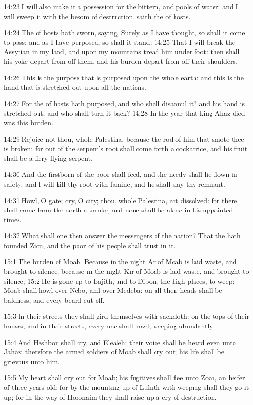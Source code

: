 14:23 I will also make it a possession for the bittern, and pools of water: and I will sweep it with the besom of destruction, saith the \LORD of hosts.

14:24 The \LORD of hosts hath sworn, saying, Surely as I have thought, so shall it come to pass; and as I have purposed, so shall it stand: 14:25 That I will break the Assyrian in my land, and upon my mountains tread him under foot: then shall his yoke depart from off them, and his burden depart from off their shoulders.

14:26 This is the purpose that is purposed upon the whole earth: and this is the hand that is stretched out upon all the nations.

14:27 For the \LORD of hosts hath purposed, and who shall disannul it?  and his hand is stretched out, and who shall turn it back?  14:28 In the year that king Ahaz died was this burden.

14:29 Rejoice not thou, whole Palestina, because the rod of him that smote thee is broken: for out of the serpent's root shall come forth a cockatrice, and his fruit shall be a fiery flying serpent.

14:30 And the firstborn of the poor shall feed, and the needy shall lie down in safety: and I will kill thy root with famine, and he shall slay thy remnant.

14:31 Howl, O gate; cry, O city; thou, whole Palestina, art dissolved: for there shall come from the north a smoke, and none shall be alone in his appointed times.

14:32 What shall one then answer the messengers of the nation? That the \LORD hath founded Zion, and the poor of his people shall trust in it.

15:1 The burden of Moab. Because in the night Ar of Moab is laid waste, and brought to silence; because in the night Kir of Moab is laid waste, and brought to silence; 15:2 He is gone up to Bajith, and to Dibon, the high places, to weep: Moab shall howl over Nebo, and over Medeba: on all their heads shall be baldness, and every beard cut off.

15:3 In their streets they shall gird themselves with sackcloth: on the tops of their houses, and in their streets, every one shall howl, weeping abundantly.

15:4 And Heshbon shall cry, and Elealeh: their voice shall be heard even unto Jahaz: therefore the armed soldiers of Moab shall cry out; his life shall be grievous unto him.

15:5 My heart shall cry out for Moab; his fugitives shall flee unto Zoar, an heifer of three years old: for by the mounting up of Luhith with weeping shall they go it up; for in the way of Horonaim they shall raise up a cry of destruction.

